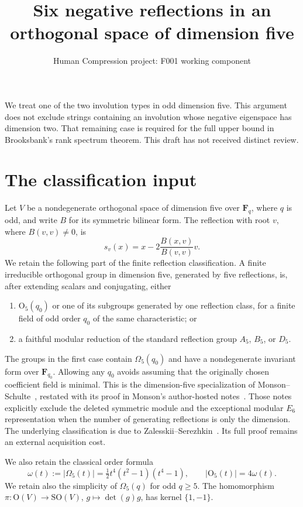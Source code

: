\documentclass[11pt,a4paper]{article}
\title{Six negative reflections in an orthogonal space of dimension five}
\author{Human Compression project: F001 working component}
\date{}
\newcommand{\F}{\mathbf F}
\newcommand{\Om}{\Omega}
\begin{document}
\maketitle
We treat one of the two involution types in odd dimension five. This
argument does not exclude strings containing an involution whose
negative eigenspace has dimension two. That remaining case is required
for the full upper bound in Brooksbank's rank spectrum theorem.
This draft has not received distinct review.

\section{The classification input}
Let $V$ be a nondegenerate orthogonal space of dimension five over
$\F_q$, where $q$ is odd, and write $B$ for its symmetric bilinear
form. The reflection with root $v$, where $B(v,v)\ne0$, is
\[
 s_v(x)=x-2\frac{B(x,v)}{B(v,v)}v.
\]
We retain the following part of the finite reflection classification.
A finite irreducible orthogonal group in dimension five, generated by
five reflections, is, after extending scalars and conjugating, either
\begin{enumerate}
\item $\mathrm O_5(q_0)$ or one of its subgroups generated by one
reflection class, for a finite field of odd order $q_0$ of the same
characteristic; or
\item a faithful modular reduction of the standard reflection group
$A_5$, $B_5$, or $D_5$.
\end{enumerate}
The groups in the first case contain $\Om_5(q_0)$ and have a
nondegenerate invariant form over $\F_{q_0}$. Allowing any $q_0$
avoids assuming that the originally chosen coefficient field is
minimal. This is the dimension-five specialization of
Monson--Schulte~\cite[Theorem 3.1]{MS}, restated with its proof
in Monson's author-hosted notes~\cite[Theorem 4.1, pp.15--17]{M}.
Those notes explicitly exclude the deleted symmetric module and the
exceptional modular $E_6$ representation when the number of generating
reflections is only the dimension. The underlying classification is
due to Zalesskii--Serezhkin~\cite{ZS}. Its full proof remains an
external acquisition cost.

We also retain the classical order formula
\[
 \omega(t):=|\Om_5(t)|=\tfrac12t^4(t^2-1)(t^4-1),
 \qquad |\mathrm O_5(t)|=4\omega(t).                 \tag{1}
\]
We retain also the simplicity of $\Om_5(q)$ for odd $q\ge5$.
The homomorphism $\pi:\mathrm O(V)\longrightarrow\mathrm{SO}(V)$,
$g\mapsto\det(g)g$, has kernel $\{1,-1\}$.
\end{document}
